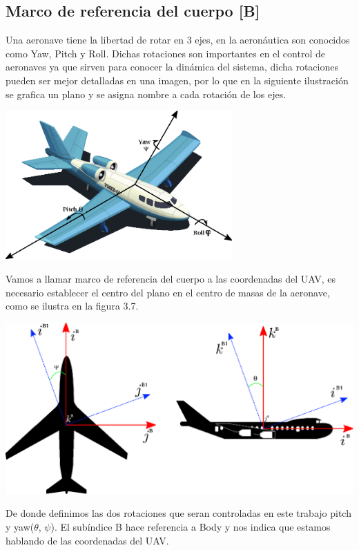 \subsection{Marco de referencia del cuerpo [B]}
Una aeronave tiene la libertad de rotar en 3 ejes, en la aeronáutica son conocidos como
Yaw, Pitch y Roll. Dichas rotaciones son importantes en el control de aeronaves ya
que sirven para conocer la dinámica del sistema, dicha rotaciones pueden ser mejor
detalladas en una imagen, por lo que en la siguiente ilustración se grafica un plano
y se asigna nombre a cada rotación de los ejes.
\begin{center}
	\includegraphics[width=0.65\textwidth]{Contenido/Cuerpo/Capitulo3/Fig6.eps}
	\label{fig:ModeloMat:Fig1}
\end{center}
Vamos a llamar marco de referencia del cuerpo a las coordenadas del UAV, es necesario establecer el centro del plano en el
centro de masas de la aeronave, como se ilustra en la figura 3.7.
\begin{center}
	\includegraphics[width=0.9 \textwidth]{Contenido/Cuerpo/Capitulo3/Fig5.eps}
	\label{fig:ModeloMat:Fig1}
\end{center}
De donde definimos las dos rotaciones que seran controladas en este trabajo pitch y yaw($\theta$, $\psi$). El subíndice B hace referencia
a Body y nos indica que estamos hablando de las coordenadas del UAV.


